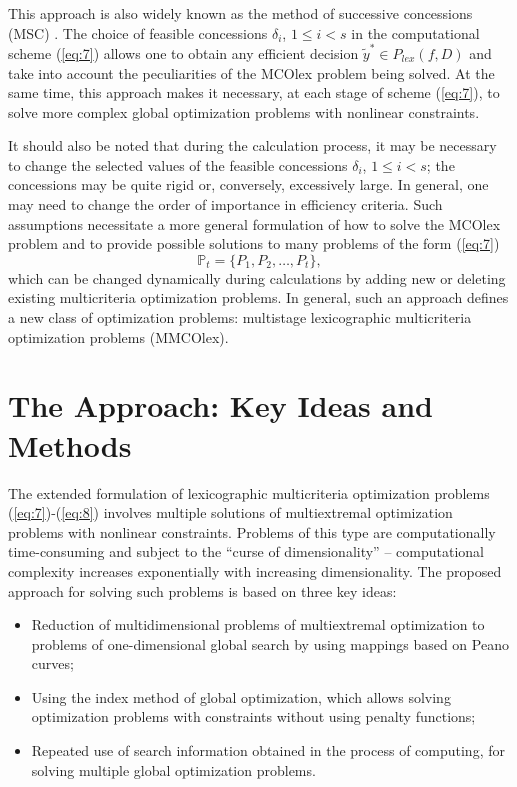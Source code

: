 \documentclass[smallextended]{svjour3}       %
\begin{document}
This approach is also widely known as the method of successive concessions (MSC) \cite{c3,c4,c5}. The choice of feasible concessions $\delta_i$, $1 \leq i < s$ in the computational scheme (\ref{eq:7}) allows one to obtain any efficient decision $\widetilde{y}^* \in P_{lex}(f,D)$ and take into account the peculiarities of the MCOlex problem being solved. At the same time, this approach makes it necessary, at each stage of scheme (\ref{eq:7}), to solve more complex global optimization problems with nonlinear constraints.

It should also be noted that during the calculation process, it may be necessary to change the selected values of the feasible concessions $\delta_i$, $1 \leq i < s$; the concessions may be quite rigid or, conversely, excessively large. In general, one may need to change the order of importance in efficiency criteria. Such assumptions necessitate a more general formulation of how to solve the MCOlex problem and to provide possible solutions to many problems of the form (\ref{eq:7})
\begin{equation}\label{eq:8}
\mathbb{P}_t=\{ P_1,P_2,\dots,P_t\},
\end{equation}
which can be changed dynamically during calculations by adding new or deleting existing multicriteria optimization problems. In general, such an approach defines a new class of optimization problems: multistage lexicographic multicriteria optimization problems (MMCOlex).

\section{The Approach: Key Ideas and Methods}
\label{sec:3}

The extended formulation of lexicographic multicriteria optimization problems (\ref{eq:7})-(\ref{eq:8}) involves multiple solutions of multiextremal optimization problems with nonlinear constraints. Problems of this type are computationally time-consuming and subject to the ``curse of dimensionality'' -- computational complexity increases exponentially with increasing dimensionality. The proposed approach for solving such problems is based on three key ideas:
\begin{itemize}
  \item Reduction of multidimensional problems of multiextremal optimization to problems of one-dimensional global search by using mappings based on Peano curves;
  \item Using the index method of global optimization, which allows solving optimization problems with constraints without using penalty functions;
  \item Repeated use of search information obtained in the process of computing, for solving multiple global optimization problems.
\end{itemize}
\end{document}
